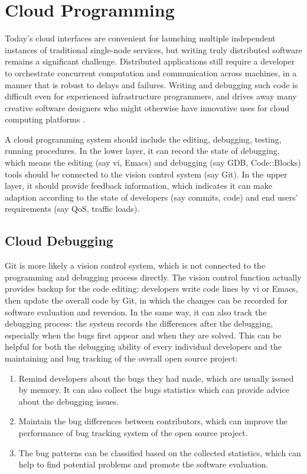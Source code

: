 \documentclass[draftclsnofoot,journal,onecolumn,12pt]{IEEEtran}
\begin{document}
\section{Cloud Programming}

Today’s cloud interfaces are convenient for launching multiple independent instances of traditional single-node services, but writing truly distributed software remains a significant challenge. Distributed applications still require a developer to orchestrate concurrent computation and communication across machines, in a manner that is robust to delays and failures. Writing and debugging such code is difficult even for experienced infrastructure programmers, and drives away many creative software designers who might otherwise have innovative uses for cloud computing platforms \cite{Alvaro:2010:BAE:1755913.1755937}.

A cloud programming system should include the editing, debugging, testing, running procedures. In the lower layer, it can record the state of debugging, which means the editing (say vi, Emacs) and debugging (say GDB, Code::Blocks) tools should be connected to the vision control system (say Git). In the upper layer, it should provide feedback information, which indicates it can make adaption according to the state of developers (say commits, code) and end users' requirements (say QoS, traffic loads).

\subsection{Cloud Debugging}
Git is more likely a vision control system, which is not connected to the programming and debugging process directly. The vision control function actually provides backup for the code editing: developers write code lines by vi or Emacs, then update the overall code by Git, in which the changes can be recorded for software evaluation and reversion. In the same way, it can also track the debugging process: the system records the differences after the debugging, especially when the bugs first appear and when they are solved. This can be helpful for both the debugging ability of every individual developers and the maintaining and bug tracking of the overall open source project:

\begin{enumerate}
  \item Remind developers about the bugs they had made, which are usually issued by memory. It can also collect the bugs statistics which can provide advice about the debugging issues.
  \item Maintain the bug differences between contributors, which can improve the performance of bug tracking system of the open source project.
  \item The bug patterns can be classified based on the collected statistics, which can help to find potential problems and promote the software evaluation.
\end{enumerate}
\end{document}
